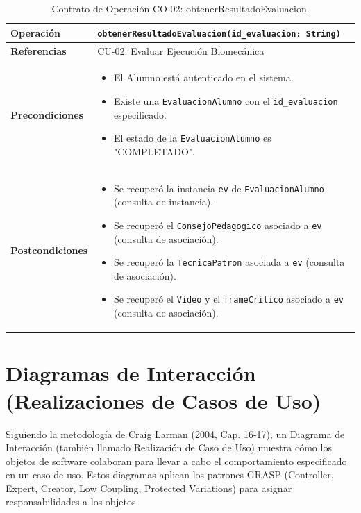\documentclass[12pt,letterpaper]{article}
\begin{document}
\begin{table}[H]
\centering
\small
\begin{tabular}{|p{3cm}|p{11cm}|}
\hline
\textbf{Operación} & \texttt{obtenerResultadoEvaluacion(id\_evaluacion: String)} \\
\hline
\textbf{Referencias} & CU-02: Evaluar Ejecución Biomecánica \\
\hline
\textbf{Precondiciones} & \begin{itemize}
    \item El Alumno está autenticado en el sistema.
    \item Existe una \texttt{EvaluacionAlumno} con el \texttt{id\_evaluacion} especificado.
    \item El estado de la \texttt{EvaluacionAlumno} es "COMPLETADO".
\end{itemize} \\
\hline
\textbf{Postcondiciones} & \begin{itemize}
    \item Se recuperó la instancia \texttt{ev} de \texttt{EvaluacionAlumno} (consulta de instancia).
    \item Se recuperó el \texttt{ConsejoPedagogico} asociado a \texttt{ev} (consulta de asociación).
    \item Se recuperó la \texttt{TecnicaPatron} asociada a \texttt{ev} (consulta de asociación).
    \item Se recuperó el \texttt{Video} y el \texttt{frameCritico} asociado a \texttt{ev} (consulta de asociación).
\end{itemize} \\
\hline
\end{tabular}
\caption{Contrato de Operación CO-02: obtenerResultadoEvaluacion.}
\label{tab:contrato-obtener-resultado}
\end{table}

\section{Diagramas de Interacción (Realizaciones de Casos de Uso)}
\label{sec:interaccion}

Siguiendo la metodología de Craig Larman (2004, Cap. 16-17), un Diagrama de Interacción (también llamado Realización de Caso de Uso) muestra cómo los objetos de software colaboran para llevar a cabo el comportamiento especificado en un caso de uso. Estos diagramas aplican los patrones GRASP (Controller, Expert, Creator, Low Coupling, Protected Variations) para asignar responsabilidades a los objetos.
\end{document}
